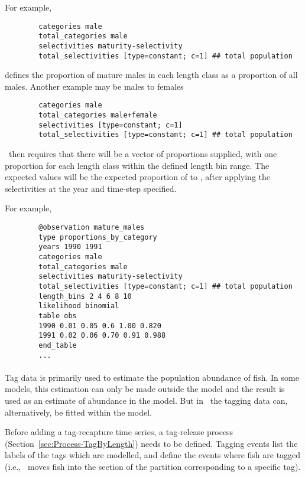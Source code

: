 For example,

{\small{\begin{verbatim}
		categories male
		total_categories male
		selectivities maturity-selectivity
		total_selectivities [type=constant; c=1] ## total population
		\end{verbatim}}}
defines the proportion of mature males in each length class as a proportion of all males. Another example may be males to females
{\small{\begin{verbatim}
		categories male
		total_categories male+female
		selectivities [type=constant; c=1]
		total_selectivities [type=constant; c=1] ## total population
		\end{verbatim}}}
\CNAME\ then requires that there will be a vector of proportions supplied, with one proportion for each length class within the defined length bin range. The expected values will be the expected proportion of  to , after applying the selectivities at the year and time-step specified.

For example,

{\small{\begin{verbatim}
		@observation mature_males
		type proportions_by_category
		years 1990 1991
		categories male
		total_categories male
		selectivities maturity-selectivity
		total_selectivities [type=constant; c=1] ## total population
		length_bins 2 4 6 8 10 
		likelihood binomial
		table obs
		1990 0.01 0.05 0.6 1.00 0.820
		1991 0.02 0.06 0.70 0.91 0.988
		end_table
		...
		\end{verbatim}}}

\paragraph*{\label{sec:Observation-TagRecaptures}\label{sec:Observation-TagRecaptureByLength}}

Tag data is primarily used to estimate the population abundance of fish. In some models, this estimation can only be made outside the model and the result is used as an estimate of abundance in the model. But in \CNAME\ the tagging data can, alternatively, be fitted within the model.

Before adding a tag-recapture time series, a tag-release process (Section~\ref{sec:Process-TagByLength}) needs to be defined. Tagging events list the labels of the tags which are modelled, and define the events where fish are tagged (i.e., \CNAME\ moves fish into the section of the partition corresponding to a specific tag).

